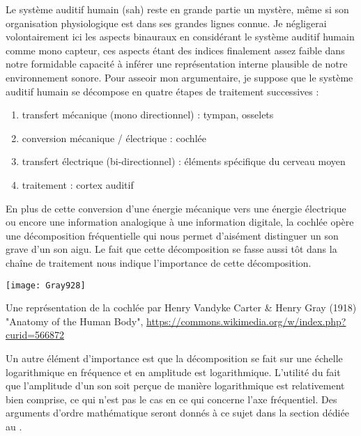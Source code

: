 Le système auditif humain (sah) reste en grande partie un mystère, même si son organisation physiologique est dans ses grandes lignes connue. Je négligerai volontairement ici les aspects binauraux en considérant le système auditif humain comme mono capteur, ces aspects étant des indices finalement assez faible dans notre formidable capacité à inférer une représentation interne plausible de notre environnement sonore. Pour asseoir mon argumentaire, je suppose que le système auditif humain se décompose en quatre étapes de traitement successives :
\begin{enumerate}
  \item transfert mécanique (mono directionnel) : tympan, osselets
  \item conversion mécanique / électrique : cochlée
  \item transfert électrique (bi-directionnel) : éléments spécifique du cerveau moyen
  \item traitement : cortex auditif
\end{enumerate}

En plus de cette conversion d'une énergie mécanique vers une énergie électrique ou encore une information analogique à une information digitale, la cochlée opère une décomposition fréquentielle qui nous permet d'aisément distinguer un son grave d'un son aigu. Le fait que cette décomposition se fasse aussi tôt dans la chaîne de traitement nous indique l'importance de cette décomposition.

\begin{marginfigure}
  \texttt{[image: Gray928]}
  \caption{Une représentation de la cochlée par Henry Vandyke Carter \& Henry Gray (1918) "Anatomy of the Human Body", \url{https://commons.wikimedia.org/w/index.php?curid=566872}}
\end{marginfigure}

Un autre élément d'importance est que la décomposition se fait sur une échelle logarithmique en fréquence et  en amplitude est logarithmique. L'utilité du fait que l'amplitude d'un son soit perçue de manière logarithmique est relativement bien comprise, ce qui n'est pas le cas en ce qui concerne l'axe fréquentiel. Des arguments d'ordre mathématique seront donnés à ce sujet dans la section dédiée au .

